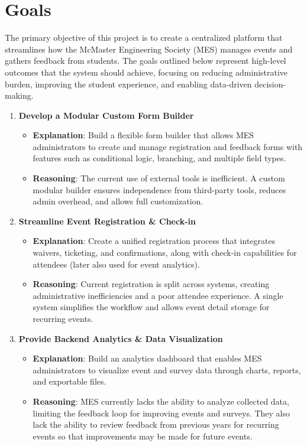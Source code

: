 \documentclass{article}
\begin{document}
\section{Goals}
The primary objective of this project is to create a centralized platform that streamlines how the McMaster Engineering Society (MES) manages events and gathers feedback from students. The goals outlined below represent high-level outcomes that the system should achieve, focusing on reducing administrative burden, improving the student experience, and enabling data-driven decision-making.
\begin{enumerate}[align=left,
  leftmargin=*,
  itemindent=0em,
  label=\bfseries G-\arabic*:]
    \item \textbf{Develop a Modular Custom Form Builder}
    \begin{itemize}
        \item \textbf{Explanation}: Build a flexible form builder that allows MES administrators to create and manage registration and feedback forms with features such as conditional logic, branching, and multiple field types.
        \item \textbf{Reasoning}: The current use of external tools is inefficient. A custom modular builder ensures independence from third-party tools, reduces admin overhead, and allows full customization.
    \end{itemize}

    \item \textbf{Streamline Event Registration \& Check-in}
    \begin{itemize}
        \item \textbf{Explanation}: Create a unified registration process that integrates waivers, ticketing, and confirmations, along with check-in capabilities for attendees (later also used for event analytics).
        \item \textbf{Reasoning}: Current registration is split across systems, creating administrative inefficiencies and a poor attendee experience. A single system simplifies the workflow and allows event detail storage for recurring events.
    \end{itemize}

    \item \textbf{Provide Backend Analytics \& Data Visualization}
    \begin{itemize}
        \item \textbf{Explanation}: Build an analytics dashboard that enables MES administrators to visualize event and survey data through charts, reports, and exportable files.
        \item \textbf{Reasoning}: MES currently lacks the ability to analyze collected data, limiting the feedback loop for improving events and surveys. They also lack the ability to review feedback from previous years for recurring events so that improvements may be made for future events.
    \end{itemize}


\end{enumerate}
\end{document}
